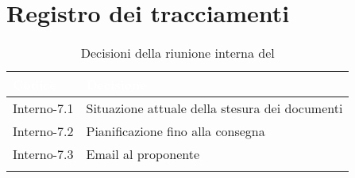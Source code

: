 \section{Registro dei tracciamenti}
{
\renewcommand{\arraystretch}{1.5}
\centering
\begin{longtable}{C{3cm} C{9cm}}
\textcolor{white}{\textbf{Codice}}&
\textcolor{white}{\textbf{Decisione}}\\	

\endhead
		
Interno-7.1 & Situazione attuale della stesura dei documenti\\
Interno-7.2 & Pianificazione fino alla consegna\\
Interno-7.3 & Email al proponente\\
\caption{Decisioni della riunione interna del \Data{}}
\end{longtable}
}
